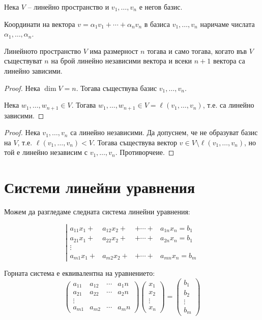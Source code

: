 \begin{definition}
    Нека $V$ -- линейно пространство и $v_1,\dots,v_n$ е негов базис.
    
    Координати на вектора $v = \alpha_1v_1+\cdots+\alpha_nv_n$ в базиса $v_1,\dots,v_n$ наричаме числата $\alpha_1,\dots,\alpha_n$.
\end{definition}

\begin{theorem}
    Линейното пространство $V$ има размерност $n$ тогава и само тогава, когато във $V$ съществуват $n$ на брой линейно независими вектора и всеки $n+1$ вектора са линейно зависими.
    \begin{proof}
        Нека $\dim V = n$. Тогава съществува базис $v_1,\dots,v_n$.

        Нека $w_1,\dots,w_{n+1} \in V$. Тогава $w_1,\dots,w_{n+1} \in V = \ell(v_1,\dots,v_n)$, т.е. са линейно зависими.
    \end{proof}
    \begin{proof}
        Нека $v_1,\dots,v_n$ са линейно независими. Да допуснем, че не образуват базис на $V$, т.е. $\ell(v_1,\dots,v_n) < V$.
        Тогава съществува вектор $v \in V \setminus \ell(v_1,\dots,v_n)$, но той е линейно независим с $v_1,\dots,v_n$. Противорчеие.
    \end{proof}
\end{theorem}

\section{Системи линейни уравнения}
Можем да разгледаме следната система линейни уравнения:

\[\left|\begin{matrix}
a_{11}x_1+&a_{12}x_2+&+\cdots+&a_{1n}x_n = b_1 \\
a_{21}x_1+&a_{22}x_2+&+\cdots+&a_{2n}x_n = b_1 \\
\vdots \\
a_{m1}x_1+&a_{m2}x_2+&+\cdots+&a_{mn}x_n = b_m
\end{matrix}\right.\]

Горната система е еквивалентна на уравнението:
\[
\begin{pmatrix}
a_{11} & a_{12} & \cdots & {a_1n} \\
a_{21} & a_{22} & \cdots & {a_2n} \\
\vdots \\
a_{m1} & a_{m2} & \cdots & {a_mn}
\end{pmatrix}
\begin{pmatrix}
    x_1 \\ x_2 \\ \vdots \\ x_n
\end{pmatrix}
=
\begin{pmatrix}
    b_1 \\ b_2 \\ \vdots \\ b_m
\end{pmatrix}
\]
